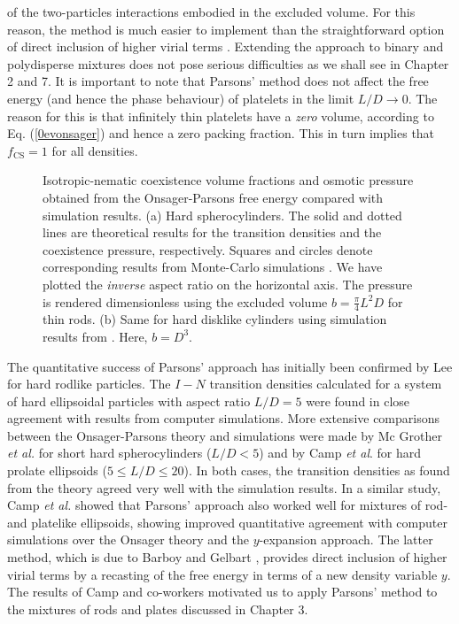 \documentclass[amssymb]{revtex4}
\begin{document}
of the two-particles interactions embodied in the 
excluded volume. For this reason, the method is much easier to implement than
the straightforward option of direct inclusion of higher virial terms \cite
{Frenkel85,tjiptomargo}. 
Extending the approach to binary and polydisperse mixtures does not pose serious difficulties
as we shall see in Chapter 2 and 7.
It is important to note that Parsons' method does not affect the free energy
(and hence the phase behaviour) of platelets in the limit $L/D\rightarrow 0$.
The reason for this is that infinitely thin platelets have a {\em zero} volume,
 according to Eq. (\ref{0evonsager}) and
hence a zero packing fraction. This in turn implies 
that $f_{\text{CS}}=1$ for all densities.

 


\begin{figure}
\caption{Isotropic-nematic coexistence volume fractions and osmotic pressure
obtained from the Onsager-Parsons free energy compared with simulation results.
(a) Hard spherocylinders. The solid and dotted lines are theoretical results
for the transition densities and the coexistence pressure, respectively.
Squares and circles denote corresponding results from Monte-Carlo simulations
\cite{Bolhuisintracing}. We have plotted the {\em inverse} aspect ratio
on the horizontal axis. The pressure is rendered dimensionless using the excluded volume
$b=\frac{\pi}{4}L^{2}D$ for thin rods.
(b) Same for hard disklike cylinders using simulation results from  \cite{zhang2}.
Here, $b=D^{3}$.} 
\end{figure}


The quantitative success of Parsons' approach has initially been confirmed by Lee 
\cite{Lee87,Lee89} for hard rodlike particles. The
$I-N$ transition densities  calculated for a system of hard ellipsoidal particles with
aspect ratio $L/D=5$   were found in close agreement with
results from computer simulations. More extensive comparisons between the Onsager-Parsons
theory and  simulations were made by Mc Grother {\em et al.} \cite
{mcgrother} for short hard spherocylinders ($L/D<5$) and by Camp {\em et al}. 
\cite{campallenkofke} for hard prolate ellipsoids ($5\leq L/D\leq 20$). In
both cases, the transition densities as found from the theory agreed very
well with the simulation results. In a similar study,  Camp {\em et al.} \cite
{CampAllen,CampAllenBolhuisFrenkel} showed that Parsons' approach also
worked well for mixtures of rod- and platelike ellipsoids, showing 
improved quantitative agreement with computer simulations over the Onsager
theory and the $y$-expansion approach. The latter method, which is due to
Barboy and Gelbart \cite{barboy}, provides direct inclusion of  higher
virial terms by a recasting of the free energy in terms of a new density
variable $y$. The results of Camp and co-workers  motivated us 
to apply Parsons' method to the mixtures of rods and plates discussed in Chapter 3.
\end{document}
